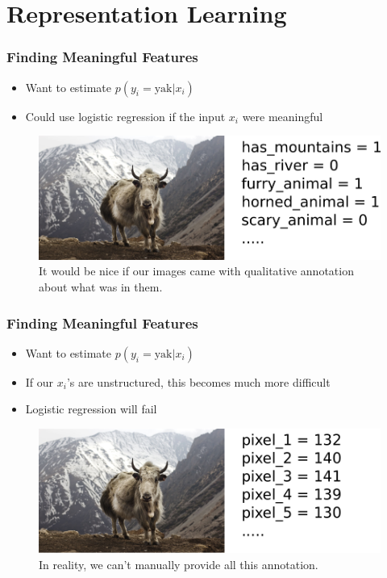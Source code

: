 \documentclass[10pt,mathserif]{beamer}
\begin{document}
\section{Representation Learning}

\begin{frame}
  \frametitle{Finding Meaningful Features}
 \begin{itemize}
 \item Want to estimate $p\left(y_i = \text{yak} \vert x_i\right)$
 \item Could use logistic regression if the input $x_i$ were meaningful
 \end{itemize}
 \begin{figure}[ht]
   \centering
   \includegraphics[width=0.7\paperwidth]{figure/image_features_ideal}
   \caption{It would be nice if our images came with qualitative annotation
     about what was in them. \label{fig:image_features_ideal} }
 \end{figure}
\end{frame}

\begin{frame}
  \frametitle{Finding Meaningful Features}
 \begin{itemize}
 \item Want to estimate $p\left(y_i = \text{yak} \vert x_i\right)$
 \item If our $x_i$'s are unstructured, this becomes much more difficult
 \item Logistic regression will fail
 \end{itemize}
 \begin{figure}[ht]
   \centering
   \includegraphics[width=0.7\paperwidth]{figure/image_features_reality}
   \caption{In reality, we can't manually provide all this
     annotation. \label{fig:image_features_reality} }
 \end{figure}
\end{frame}
\end{document}
